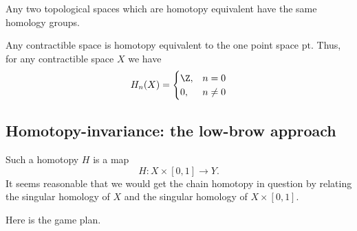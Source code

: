 \documentclass[main.tex]{subfiles}
\begin{document}
\begin{corollary}
  Any two topological spaces which are homotopy equivalent have the same homology groups.
\end{corollary}

\begin{example}
  Any contractible space is homotopy equivalent to the one point space $\mathrm{pt}$. Thus, for any contractible space $X$ we have
  \begin{equation*}
    H_{n}(X) =
    \begin{cases}
      \Z, &n = 0 \\
      0, &n \neq 0
    \end{cases}
  \end{equation*}
\end{example}

\subsection{Homotopy-invariance: the low-brow approach}
\label{ssc:homotopy_invariance_the_low_brow_approach}


Such a homotopy $H$ is a map
\begin{equation*}
  H\colon X \times [0, 1] \to Y.
\end{equation*}
It seems reasonable that we would get the chain homotopy in question by relating the singular homology of $X$ and the singular homology of $X \times [0, 1]$.

Here is the game plan.
\end{document}
